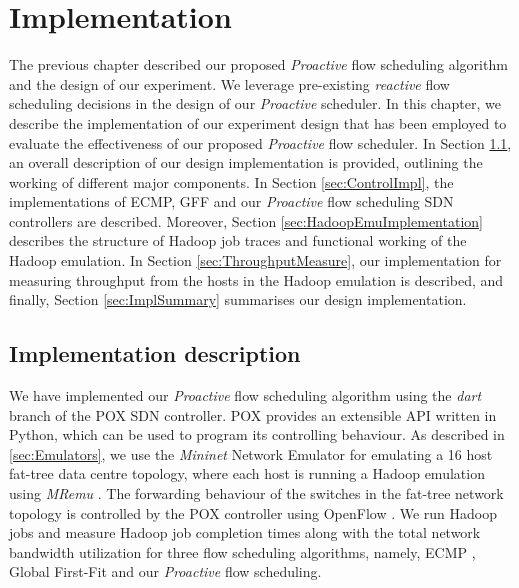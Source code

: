 \chapter{Implementation} \label{chap:Implmentation}

The previous chapter described our proposed \textit{Proactive} flow scheduling algorithm and the design of our experiment. We leverage pre-existing \textit{reactive} flow scheduling decisions in the design of our \textit{Proactive} scheduler. In this chapter, we describe the implementation of our experiment design that has been employed to evaluate the effectiveness of our proposed \textit{Proactive} flow scheduler. In Section \ref{sec:ImplDesc}, an overall description of our design implementation is provided, outlining the working of different major components. In Section \ref{sec:ControlImpl}, the implementations of ECMP, GFF and our \textit{Proactive} flow scheduling SDN controllers are described. Moreover, Section \ref{sec:HadoopEmuImplementation} describes the structure of Hadoop job traces and functional working of the Hadoop emulation. In Section \ref{sec:ThroughputMeasure}, our implementation for measuring throughput from the hosts in the Hadoop emulation is described, and finally, Section \ref{sec:ImplSummary} summarises our design implementation.   


\section{Implementation description} \label{sec:ImplDesc}

We have implemented our \textit{Proactive} flow scheduling algorithm using the \textit{dart} branch \cite{POXdart} of the POX \cite{POXSDN} SDN controller. POX provides an extensible API written in Python, which can be used to program its controlling behaviour. As described in \ref{sec:Emulators}, we use the \textit{Mininet} Network Emulator \cite{lantz2010network} for emulating a 16 host fat-tree data centre topology, where each host is running a Hadoop emulation using \textit{MRemu} \cite{neves2015mremu}. The forwarding behaviour of the switches in the fat-tree network topology is controlled by the POX controller using OpenFlow \cite{mckeown2008openflow}. We run Hadoop jobs and measure Hadoop job completion times along with the total network bandwidth utilization for three flow scheduling algorithms, namely, ECMP \cite{hopps2000analysis}, Global First-Fit \cite{al2010hedera} and our \textit{Proactive} flow scheduling.

